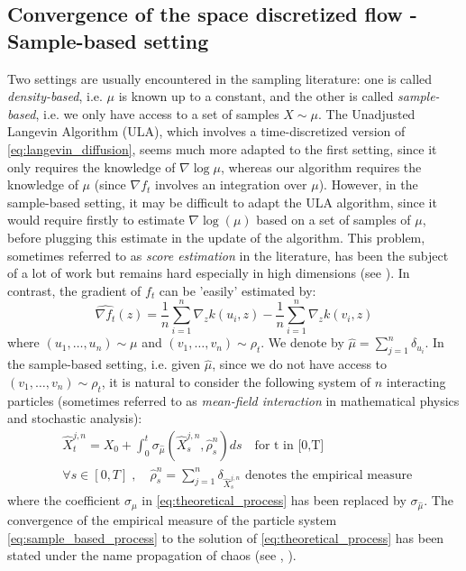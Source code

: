 \subsection{Convergence of the space discretized flow - Sample-based setting}

Two settings are usually encountered in the sampling literature: one is called \textit{density-based}, i.e. $\mu$ is known up to a constant, and the other is called \textit{sample-based}, i.e. we only have access to a set of samples $X \sim \mu$.
The Unadjusted Langevin Algorithm (ULA), which involves a time-discretized version of \eqref{eq:langevin_diffusion}, seems much more adapted to the first setting, since it only requires the knowledge of $\nabla \log \mu$, whereas our algorithm requires the knowledge of $\mu$ (since $\nabla f_t$ involves an integration over $\mu$). However, in the sample-based setting, it may be difficult to adapt the ULA algorithm, since it would require firstly to estimate $\nabla \log(\mu)$ based on a set of samples of $\mu$, before plugging this estimate in the update of the algorithm. This problem, sometimes referred to as \textit{score estimation} in the literature, has been the subject of a lot of work but remains hard especially in high dimensions (see \cite{sutherland2017efficient,li2018gradient,shi2018spectral}). In contrast, the gradient of $f_t$ can be 'easily' estimated by:
\begin{equation}
\widehat{\nabla f_t}(z)= \frac{1}{n}\sum_{i=1}^{n}\nabla_{z}k(u_i,z) -\frac{1}{n}\sum_{i=1}^{n}\nabla_{z}k(v_i,z) 
\end{equation}
where $(u_1, \dots, u_n)\sim \mu$ and $(v_1, \dots, v_n)\sim \rho_t$. We denote by $\widehat{ \mu}=\sum_{j=1}^{n}\delta_{u_i}$. In the sample-based setting, i.e. given $\widehat{\mu}$, since we do not have access to $(v_1, \dots, v_n)\sim \rho_t$, it is natural to consider the following system of $n$ interacting particles (sometimes referred to as \textit{mean-field interaction} in mathematical physics and stochastic analysis):
\begin{align}\label{eq:sample_based_process}
&\widehat{X}_t^{j,n}=X_{0}+\int_{0}^t \sigma_{\widehat{\mu}}(\widehat{X}_s^{j,n}, \widehat{\rho}_s^n)ds \quad \text{for t in [0,T]}\\
&\forall s \in [0,T]\;,\quad \widehat{\rho}_s^n=\sum_{j=1}^{n} \delta_{\widehat{X}_s^{j,n}} \text{ denotes the empirical measure } 
\end{align}
where the coefficient $\sigma_{\mu}$ in \eqref{eq:theoretical_process} has been replaced by $\sigma_{\widehat{\mu}}$. The convergence of the empirical measure of the particle system \eqref{eq:sample_based_process} to the solution of \eqref{eq:theoretical_process} has been stated under the name propagation of chaos (see \cite{kac1956foundations}, \cite{sznitman1991topics}).



